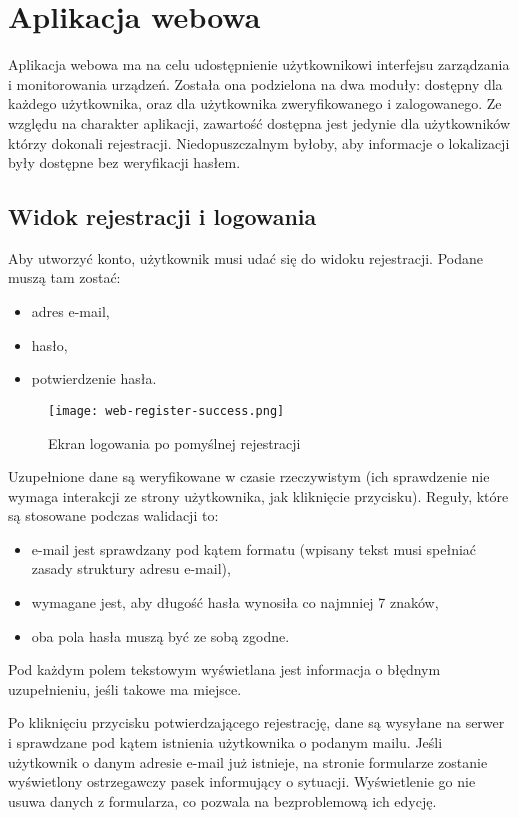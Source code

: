 \documentclass[eng,printmode]{mgr}
\begin{document}
\section{Aplikacja webowa}
Aplikacja webowa ma na celu udostępnienie użytkownikowi interfejsu zarządzania i monitorowania urządzeń.
Została ona podzielona na dwa moduły: dostępny dla każdego użytkownika, oraz dla użytkownika zweryfikowanego i zalogowanego. Ze względu na charakter aplikacji, zawartość dostępna jest jedynie dla użytkowników którzy dokonali rejestracji. Niedopuszczalnym byłoby, aby informacje o lokalizacji były dostępne bez weryfikacji hasłem.

\subsection{Widok rejestracji i logowania}
Aby utworzyć konto, użytkownik musi udać się do widoku rejestracji. Podane muszą tam zostać:
\begin{itemize}
\item adres e-mail,
\item hasło,
\item potwierdzenie hasła.
\end{itemize}

\begin{figure}
\centering
\texttt{[image: web-register-success.png]}
\caption{Ekran logowania po pomyślnej rejestracji}
\end{figure}

Uzupełnione dane są weryfikowane w czasie rzeczywistym (ich sprawdzenie nie wymaga interakcji ze strony użytkownika, jak kliknięcie przycisku). Reguły, które są stosowane podczas walidacji to:
\begin{itemize}
\item e-mail jest sprawdzany pod kątem formatu (wpisany tekst musi spełniać zasady struktury adresu e-mail),
\item wymagane jest, aby długość hasła wynosiła co najmniej 7 znaków,
\item oba pola hasła muszą być ze sobą zgodne.
\end{itemize}
Pod każdym polem tekstowym wyświetlana jest informacja o błędnym uzupełnieniu, jeśli takowe ma miejsce.

Po kliknięciu przycisku potwierdzającego rejestrację, dane są wysyłane na serwer i sprawdzane pod kątem istnienia użytkownika o podanym mailu. Jeśli użytkownik o danym adresie e-mail już istnieje, na stronie formularze zostanie wyświetlony ostrzegawczy pasek informujący o sytuacji. Wyświetlenie go nie usuwa danych z formularza, co pozwala na bezproblemową ich edycję.
\end{document}
